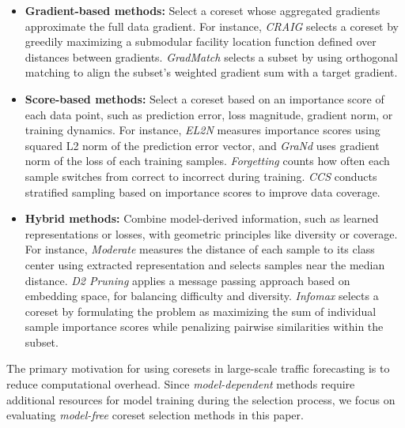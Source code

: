 \begin{itemize}
    \item \textbf{Gradient-based methods:} Select a coreset whose aggregated gradients approximate the full data gradient. For instance, \textit{CRAIG} \cite{mirzasoleiman_coresets_2020} selects a coreset by greedily maximizing a submodular facility location function defined over distances between gradients. \textit{GradMatch} \cite{killamsetty_grad-match_2021} selects a subset by using orthogonal matching to align the subset's weighted gradient sum with a target gradient.

    \item \textbf{Score-based methods:} Select a coreset based on an importance score of each data point, such as prediction error, loss magnitude, gradient norm, or training dynamics. For instance, \textit{EL2N} \cite{paul_deep_2021} measures importance scores using squared L2 norm of the prediction error vector, and \textit{GraNd} \cite{paul_deep_2021} uses gradient norm of the loss of each training samples. \textit{Forgetting} \cite{toneva_empirical_2018} counts how often each sample switches from correct to incorrect during training. \textit{CCS} \cite{zheng_coverage-centric_2022} conducts stratified sampling based on importance scores to improve data coverage.


    \item \textbf{Hybrid methods: } Combine model-derived information, such as learned representations or losses, with geometric principles like diversity or coverage. For instance, \textit{Moderate} \cite{xia_moderate_2022} measures the distance of each sample to its class center using extracted representation and selects samples near the median distance. \textit{D2 Pruning} \cite{maharana_d2_2023} applies a message passing approach based on embedding space, for balancing difficulty and diversity. \textit{Infomax} \cite{tan_data_2025} selects a coreset by formulating the problem as maximizing the sum of individual sample importance scores while penalizing pairwise similarities within the subset.
\end{itemize}

The primary motivation for using coresets in large-scale traffic forecasting is to reduce computational overhead. Since \textit{model-dependent} methods require additional resources for model training during the selection process, we focus on evaluating \textit{model-free} coreset selection methods in this paper.